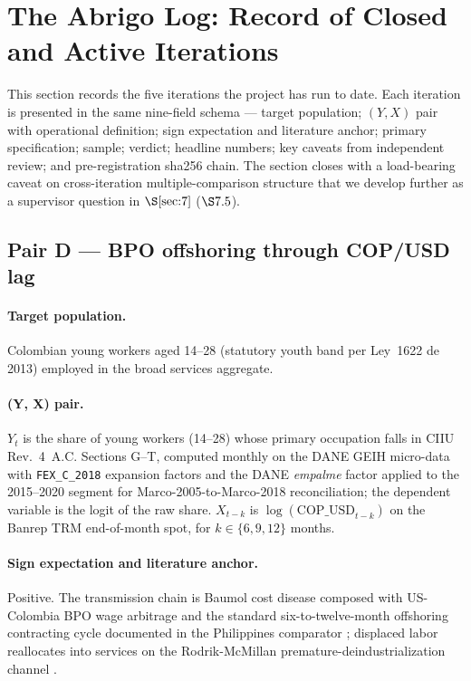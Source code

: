 \section{The Abrigo Log: Record of Closed and Active Iterations}\label{sec:6}

This section records the five iterations the project has run to date.
Each iteration is presented in the same nine-field schema --- target
population; \((Y, X)\) pair with operational definition; sign
expectation and literature anchor; primary specification; sample;
verdict; headline numbers; key caveats from independent review; and
pre-registration sha256 chain. The section closes with a load-bearing
caveat on cross-iteration multiple-comparison structure that we develop
further as a supervisor question in \(\S\ref{sec:7}\) (\(\S 7.5\)).

\subsection{Pair D --- BPO offshoring through COP/USD lag}\label{sec:6.1}

\paragraph{Target population.} Colombian young workers aged 14--28
(statutory youth band per Ley~1622 de 2013) employed in the broad
services aggregate.

\paragraph{(Y, X) pair.}
\(Y_t\) is the share of young workers (14--28) whose primary occupation
falls in CIIU Rev.~4~A.C. Sections G--T, computed monthly on the DANE
GEIH micro-data with \texttt{FEX\_C\_2018} expansion factors and the
DANE \emph{empalme} factor applied to the 2015--2020 segment for
Marco-2005-to-Marco-2018 reconciliation; the dependent variable is the
logit of the raw share. \(X_{t-k}\) is \(\log(\mathrm{COP\_USD}_{t-k})\)
on the Banrep TRM end-of-month spot, for \(k \in \{6, 9, 12\}\) months.

\paragraph{Sign expectation and literature anchor.} Positive. The
transmission chain is Baumol cost disease
\citep{baumolbowen1966, baumol2006} composed with US-Colombia BPO
wage arbitrage \citep{mendietamunoz2017} and the standard
six-to-twelve-month offshoring contracting cycle documented in the
Philippines comparator \citep{beerepoothendriks2013, errighibodwell2017};
displaced labor reallocates into services on the Rodrik-McMillan
premature-deindustrialization channel \citep{rodrik2016, mcmillanrodrik2011}.

